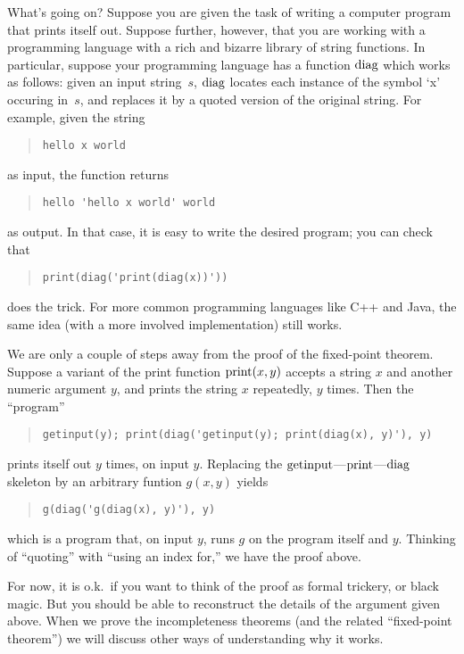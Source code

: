 \documentclass[../../include/open-logic-section]{subfiles}
\begin{document}
\begin{explain}
What's going on? Suppose you are given the task of writing a computer
program that prints itself out. Suppose further, however, that you are
working with a programming language with a rich and bizarre library of
string functions. In particular, suppose your programming language has
a function $\mathrm{diag}$ which works as follows: given an input
string~$s$, $\mathrm{diag}$ locates each instance of the symbol `x'
occuring in~$s$, and replaces it by a quoted version of the original
string. For example, given the string
\begin{quote}
\begin{verbatim}
hello x world
\end{verbatim}
\end{quote}
as input, the function returns
\begin{quote}
\begin{verbatim}
hello 'hello x world' world
\end{verbatim}
\end{quote}
as output. In that case, it is easy to write the desired program; you
can check that
\begin{quote}
\begin{verbatim}
print(diag('print(diag(x))'))
\end{verbatim}
\end{quote}
does the trick. For more common programming languages like C++ and
Java, the same idea (with a more involved implementation) still works.

We are only a couple of steps away from the proof of the fixed-point
theorem. Suppose a variant of the print function $\mathrm{print}(x,y)$
accepts a string $x$ and another numeric argument $y$, and prints the
string $x$ repeatedly, $y$ times. Then the ``program''
\begin{quote}
\begin{verbatim}
getinput(y); print(diag('getinput(y); print(diag(x), y)'), y)
\end{verbatim}
\end{quote}
prints itself out $y$ times, on input $y$. Replacing the
$\mathrm{getinput}$---$\mathrm{print}$---$\mathrm{diag}$ skeleton by an
arbitrary funtion $g(x,y)$ yields
\begin{quote}
\begin{verbatim}
g(diag('g(diag(x), y)'), y)
\end{verbatim}
\end{quote}
which is a program that, on input $y$, runs $g$ on the program itself
and $y$. Thinking of ``quoting'' with ``using an index for,'' we have
the proof above.

For now, it is o.k.\ if you want to think of the proof as formal
trickery, or black magic. But you should be able to reconstruct the
details of the argument given above. When we prove the incompleteness
theorems (and the related ``fixed-point theorem'') we will discuss
other ways of understanding why it works.
\end{explain}
\end{document}
